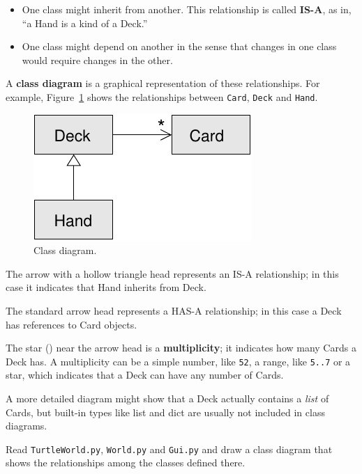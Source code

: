 \documentclass[10pt]{book}
\begin{document}
\begin{CJK}{UTF8}{gbsn}
\begin{itemize}
\item One class might inherit from another.  This relationship
is called {\bf IS-A}, as in, ``a Hand is a kind of a Deck.''

\item One class might depend on another in the sense that changes
in one class would require changes in the other.

\end{itemize}

A {\bf class diagram} is a graphical representation of these
relationships.  For example, Figure~\ref{fig.class1} shows the
relationships between {\tt Card}, {\tt Deck} and {\tt Hand}.

\begin{figure}
\centerline
{\includegraphics[scale=0.8]{figs/class1.pdf}}
\caption{Class diagram.}
\label{fig.class1}
\end{figure}


The arrow with a hollow triangle head represents an IS-A
relationship; in this case it indicates that Hand inherits
from Deck.

The standard arrow head represents a HAS-A
relationship; in this case a Deck has references to Card
objects.

The star ({\tt *}) near the arrow head is a 
{\bf multiplicity}; it indicates how many Cards a Deck has.
A multiplicity can be a simple number, like {\tt 52}, a range,
like {\tt 5..7} or a star, which indicates that a Deck can
have any number of Cards.

A more detailed diagram might show that a Deck actually
contains a {\em list} of Cards, but built-in types
like list and dict are usually not included in class diagrams.

\begin{exercise}

Read {\tt TurtleWorld.py}, {\tt World.py} and {\tt Gui.py}
and draw a class diagram that shows the relationships among
the classes defined there.


\end{exercise}
\end{CJK}
\end{document}
